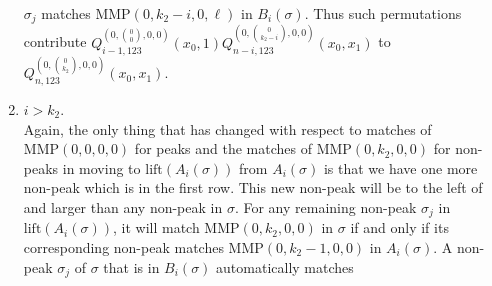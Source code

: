 \documentclass[
final,nomarks
]{dmtcs-episciences}
\newcommand{\lift}{\mathrm{lift}}
\newcommand{\Qmzn}[3]{Q_{#3,123}^{(0,\binom{#1}{#2},0,0)}(x_0,x_1)}
\newcommand{\MMP}{\mathrm{MMP}}
\begin{document}
\begin{enumerate}[{\bf Case }\bf 1.]
	\begin{math}\sigma_j\end{math} matches  \begin{math}\MMP(0,k_2-i,0,\ell)\end{math} in \begin{math}B_i(\sigma)\end{math}. Thus such permutations 
	contribute \begin{math}Q_{i-1,123}^{(0,\binom{0}{0},0,0)}(x_0,1)\Qmzn{0}{k_2-i}{n-i}\end{math} to \begin{math}\Qmzn{0}{k_2}{n}\end{math}.
	
	\item \begin{math}i >  k_2\end{math}.\\
	Again, the only thing that has changed with respect to matches of \begin{math}\MMP(0,0,0,0)\end{math} 
	for peaks and the matches of \begin{math}\MMP(0,k_2,0,0)\end{math} for non-peaks in moving  
	to \begin{math}\mathrm{lift}(A_i(\sigma))\end{math} from \begin{math}A_i(\sigma)\end{math} is that we have one more non-peak which 
	is in the first row. This new non-peak will be to the left of and larger than 
	any non-peak in \begin{math}\sigma\end{math}. For any remaining non-peak \begin{math}\sigma_j\end{math} in \begin{math}\lift(A_i(\sigma))\end{math}, it will  
	match \begin{math}\MMP(0,k_2,0,0)\end{math} in \begin{math}\sigma\end{math} if and only if its corresponding non-peak 
	matches \begin{math}\MMP(0,k_2-1,0,0)\end{math} in \begin{math}A_i(\sigma)\end{math}. 
	A non-peak \begin{math}\sigma_j\end{math} of \begin{math}\sigma\end{math} that is in \begin{math}B_i(\sigma)\end{math} automatically matches 

\end{enumerate}
\end{document}
